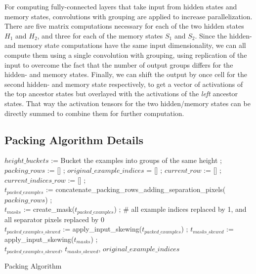 \documentclass[conference]{IEEEtran}
\begin{document}
For computing fully-connected layers that take input from hidden states  and memory states, convolutions with grouping 
are applied to increase parallelization. There are five matrix computations necessary 
for each of the two hidden states $H_1$ and $H_2$, and three for each of the memory states $S_1$ and $S_2$. 
Since the hidden- and memory state computations have the same input dimensionality, 
we can all compute them using a single convolution with grouping, using replication of the input to overcome the fact that 
the number of output groups differs for the hidden- and memory states. 
Finally, we can shift the output by once cell for the second hidden- and memory state respectively, 
to get a vector of activations of the top ancestor states but overlayed with the activations of the \emph{left} ancestor states. 
That way the activation tensors for the two hidden/memory states can be directly summed to combine them for further computation.


\subsection{Packing Algorithm Details}
\label{appendix:packing-algorithm-pseudocode}

\begin{algorithm*}
$height\_buckets$ := Bucket the examples into groups of the same height ;\\
  $packing\_rows$ :=  [] ; $original\_example\_indices$ = [] ; $current\_row$ := [] ; $current\_indices\_row$ := [] ; \\
  $t_{packed\_examples}$ := concatenate\_packing\_rows\_adding\_separation\_pixels($packing\_rows$) ;\\
  $t_{masks}$ := create\_mask($t_{packed\_examples}$) ; \# all example indices replaced by 1, and all separator pixels replaced by 0   \\
  $t_{packed\_examples\_skewed}$ := apply\_input\_skewing($t_{packed\_examples}$) ; $t_{masks\_skewed}$ := apply\_input\_skewing($t_{masks}$) ; \\
  \Return $t_{packed\_examples\_skewed}$, $t_{masks\_skewed}$, $original\_example\_indices$
  \vspace{0.2cm}
 \caption{Packing Algorithm}
 \label{algorithm:packing_algorithm}
\end{algorithm*}
\end{document}
